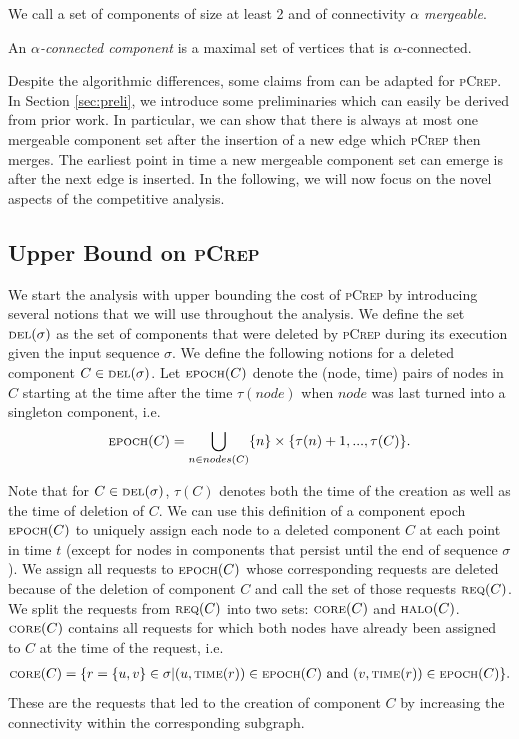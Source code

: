 \documentclass[a4paper,UKenglish,cleveref, autoref, thm-restate,authorcolumns]{lipics-v2019}
\newcommand{\adjDel}{\textsc{pCrep}}
\newcommand{\del}{\text{\scriptsize DEL}}
\newcommand{\core}{\text{\scriptsize CORE}}
\newcommand{\halo}{\text{\scriptsize HALO}}
\newcommand{\req}{\text{\scriptsize REQ}}
\newcommand{\epoch}{\text{\scriptsize EPOCH}}
\newcommand{\reqTime}{\text{\scriptsize TIME}}
\begin{document}
\begin{definition}
	We call a set of components of size at least 2 and of connectivity $\alpha$ 
	\textit{mergeable}.	
\end{definition}

\begin{definition}
	An $\alpha$\textit{-connected component} is a maximal set of vertices that is $\alpha$-connected.
\end{definition}

Despite the algorithmic differences, some claims
from \cite{Avin2015} can be adapted for \adjDel{}.
In Section \ref{sec:preli}, we introduce some preliminaries
which can easily be derived from prior work. 
In particular, we can show that there is always at most one mergeable component set after the insertion of a new edge which \adjDel{} then merges. The earliest point in time a new mergeable component set can emerge is after the next edge is inserted. 
In the following, we will now focus on the novel aspects of
the competitive analysis.

\subsection{Upper Bound on \adjDel{}}

We start the analysis with upper bounding the cost of \adjDel{} by introducing several notions that we will use throughout the analysis.
We define the set $\del(\sigma)$ as the set of components that were deleted by \adjDel{} during its execution given the input sequence $\sigma$.
We define the following notions for a deleted component $C\in\del{}(\sigma)$.
Let $\epoch{}(C)$ denote the (node, time) pairs of nodes in $C$ starting at the time after the time $\tau(node)$ when $node$ was last turned into a singleton component, i.e. 
\begin{align*}
\epoch{}(C)=\bigcup_{n\in nodes(C)}\{n\}\times\{\tau(n)+1,...,\tau(C)\}.
\end{align*}

Note that for $C\in\del(\sigma)$, $\tau(C)$ denotes both the time of the creation as well as the time of deletion of $C$. We can use this definition of a component epoch $\epoch(C)$ to uniquely assign each node to a deleted component $C$ at each point in time $t$ (except for nodes in components that persist until the end of sequence $\sigma$).
We assign all requests to $\epoch(C)$ whose corresponding requests are deleted because of the deletion of component $C$ and call the set of those requests $\req(C)$.
We split the requests from $\req{}(C)$ into two sets: $\core(C)$ and $\halo(C)$. $\core(C)$ contains all requests for which both nodes have already been assigned to $C$ at the time of the request, i.e. 
\begin{align*}
\core(C)=\{r=\{u,v\}\in\sigma| (u,\reqTime(r))\in \epoch(C)\text{ and } (v, \reqTime(r))\in \epoch(C)\}.
\end{align*}
These are the requests that led to the creation of component $C$ by increasing the connectivity within the corresponding subgraph.
\end{document}
